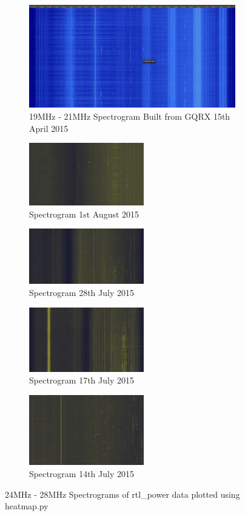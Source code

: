 \documentclass[runningheads,a4paper]{llncs}
\begin{document}
%
\begin{figure}
	\centering
	\begin{subfigure}[t]{9cm}
		\centering
		\includegraphics[width=9cm]{images/51}
		\caption{19MHz - 21MHz Spectrogram Built from GQRX 15th April 2015}
		\label{fig:gqrx_spectrogram_01} 
	\end{subfigure}
	\quad
	\begin{subfigure}[t]{5cm}
		\centering
		\includegraphics[width=5cm]{images/80}
		\caption{Spectrogram 1st August 2015}
		\label{fig:rtl_power_spectrogram_01} 
	\end{subfigure}
	\quad
	\begin{subfigure}[t]{5cm}
		\centering
		\includegraphics[width=5cm]{images/77}
		\caption{Spectrogram 28th July 2015}
		\label{fig:rtl_power_spectrogram_02} 
	\end{subfigure}
	\quad
	\begin{subfigure}[t]{5cm}
		\centering
		\includegraphics[width=5cm]{images/78}
		\caption{Spectrogram 17th July 2015}
		\label{fig:rtl_power_spectrogram_03} 
	\end{subfigure}
	\quad
	\begin{subfigure}[t]{5cm}
		\centering
		\includegraphics[width=5cm]{images/79}
		\caption{Spectrogram 14th July 2015}
		\label{fig:rtl_power_spectrogram_04} 
	\end{subfigure}
	\quad

	\caption{24MHz - 28MHz Spectrograms of rtl\_power data plotted using heatmap.py}\label{fig:rtl_power_spectrogram}
\end{figure}
%
\end{document}
